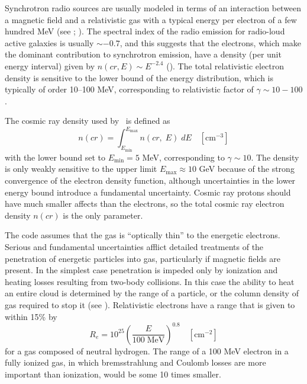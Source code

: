 Synchrotron radio sources are usually modeled in terms of an interaction
between a magnetic field and a relativistic gas with a typical energy per
electron of a few hundred MeV (see \citealp{Pacholczyk1970}; \citealp{Longair1981}).
The
spectral index of the radio emission for radio-loud active galaxies is
usually $\sim -0.7$, and this suggests that the electrons, which make the dominant
contribution to synchrotron emission, have a density (per unit energy
interval) given by $n(cr, E)\sim  E^{-2.4}$ (\citealp{Kellerman1966}).  The total relativistic
electron density is sensitive to the lower bound of the energy distribution,
which is typically of order 10--100 MeV,
corresponding to relativistic factor
of  $\gamma\sim 10-100$ \citep{Lea1978}.

The cosmic ray density used by \Cloudy\ is defined as
\begin{equation}
n(cr) = \int_{{E_{\min }}}^{{E_{\max }}} {n\left( {cr,\;E} \right)\;dE}
\quad  [\mathrm{cm}^{-3}]
\end{equation}
with the lower bound set to $E_{\mathrm{min}} = 5$ MeV, corresponding to
$\gamma\sim  10$.  The density
is only weakly sensitive to the upper limit $E_{\mathrm{max}}\approx 10$ GeV because of the
strong convergence of the electron density function, although uncertainties
in the lower energy bound introduce a fundamental uncertainty.  Cosmic ray
protons should have much smaller affects than the electrons, so the total
cosmic ray electron density $n(cr)$ is the only parameter.

The code assumes that the gas is ``optically thin'' to the energetic
electrons.  Serious and fundamental uncertainties afflict detailed treatments
of the penetration of energetic particles into gas, particularly if magnetic
fields are present.  In the simplest case penetration is impeded only by
ionization and heating losses resulting from two-body collisions.  In this
case the ability to heat an entire cloud is determined by the range of a
particle, or the column density of gas required to stop it (see \citealp{Rossi1952}).
Relativistic electrons have a range that is given to within 15\% by \citep{Berger1965}
\begin{equation}
{R_e} = {10^{25}}{\left( {\frac{E}{{100\;{\mathrm{MeV}}}}} \right)^{0.8}}
\quad [\mathrm{cm}^{-2}]
\end{equation}
for a gas composed of neutral hydrogen.
The range of a 100 MeV electron
in a fully ionized gas,
in which bremsstrahlung and Coulomb losses are more
important than ionization, would be some 10 times smaller.

